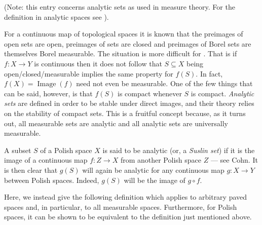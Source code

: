 \documentclass[12pt]{article}
\begin{document}

(Note: this entry concerns analytic sets as used in measure theory. For the definition in analytic spaces see ).

For a continuous map of topological spaces it is known that the preimages of open sets are open, preimages of  sets are closed and preimages of Borel sets are themselves Borel measurable. The situation is more difficult for . That is if $f\colon X\rightarrow Y$ is continuous then it does not follow that $S\subseteq X$ being open/closed/measurable implies the same property for $f(S)$.
In fact, $f(X)=\operatorname{Image}(f)$ need not even be measurable.
One of the few things that can be said, however, is that $f(S)$ is compact whenever $S$ is compact.
\emph{Analytic sets} are defined in order to be stable under direct images, and their theory relies on the stability of compact sets. This is a fruitful concept because, as it turns out, all measurable sets are analytic and all analytic sets are universally measurable.

A subset $S$ of a Polish space $X$ is said to be analytic (or, a \emph{Suslin set}) if it is the image of a continuous map $f\colon Z\rightarrow X$ from another Polish space $Z$ --- see Cohn. It is then clear that $g(S)$ will again be analytic for any continuous map $g\colon X\rightarrow Y$ between Polish spaces. Indeed, $g(S)$ will be the image of $g\circ f$.

Here, we instead give the following definition which applies to arbitrary paved spaces and, in particular, to all measurable spaces. Furthermore, for Polish spaces, it can be shown to be equivalent to the definition just mentioned above.
\end{document}

